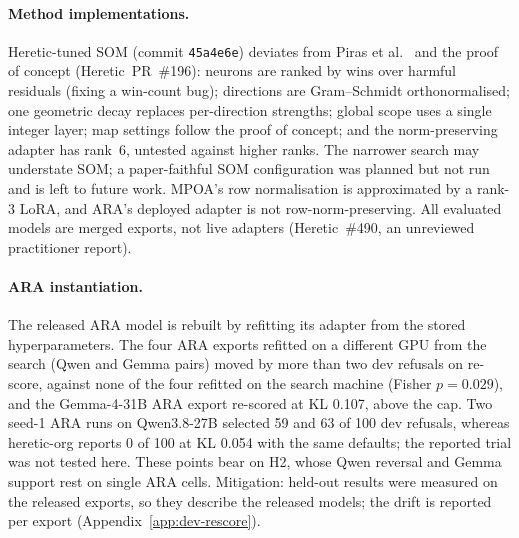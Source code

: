 \paragraph{Method implementations.}
Heretic-tuned SOM (commit \texttt{45a4e6e}) deviates from Piras et al.~\cite{piras2025som}
and the proof of concept (Heretic~PR~\#196): neurons are ranked by wins over
harmful residuals (fixing a win-count bug); directions are Gram--Schmidt
orthonormalised; one geometric decay replaces per-direction strengths; global
scope uses a single integer layer; map settings follow the proof of concept;
and the norm-preserving adapter has rank~6, untested against higher ranks. The
narrower search may understate SOM; a paper-faithful SOM configuration was
planned but not run and is left to future work. MPOA's
row normalisation is approximated by a rank-3 LoRA, and ARA's deployed adapter
is not row-norm-preserving. All evaluated models are merged exports, not live adapters
(Heretic~\#490, an unreviewed practitioner report).

\paragraph{ARA instantiation.}
The released ARA model is rebuilt by refitting its adapter from the stored
hyperparameters. The four ARA exports refitted on a different GPU from the
search (Qwen and Gemma pairs) moved by more than two dev refusals on re-score,
against none of the four refitted on the search machine (Fisher $p=0.029$),
and the Gemma-4-31B ARA export re-scored at KL 0.107, above the cap. Two
seed-1 ARA runs on Qwen3.8-27B selected 59 and 63 of 100 dev refusals,
whereas heretic-org reports 0 of 100 at KL 0.054 with the same defaults; the
reported trial was not tested here. These points bear on H2, whose Qwen
reversal and Gemma support rest on single ARA cells. Mitigation: held-out
results were measured on the released exports, so they describe the released
models; the drift is reported per export (Appendix~\ref{app:dev-rescore}).

